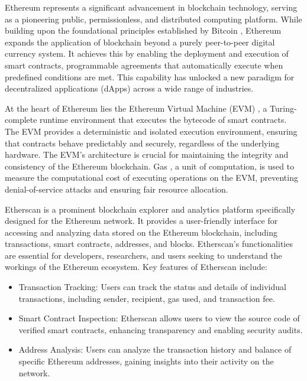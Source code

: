 \documentclass[acmsmall,screen]{acmart}
\begin{document}
	Ethereum \cite{ethereum} represents a significant advancement in blockchain technology, serving as a pioneering public, permissionless, and distributed computing platform. While building upon the foundational principles established by Bitcoin \cite{Bitcoin}, Ethereum expands the application of blockchain beyond a purely peer-to-peer digital currency system. It achieves this by enabling the deployment and execution of smart contracts, programmable agreements that automatically execute when predefined conditions are met. This capability has unlocked a new paradigm for decentralized applications (dApps) across a wide range of industries.

	At the heart of Ethereum lies the Ethereum Virtual Machine (EVM) \cite{EVM}, a Turing-complete runtime environment that executes the bytecode of smart contracts. The EVM provides a deterministic and isolated execution environment, ensuring that contracts behave predictably and securely, regardless of the underlying hardware. The EVM's architecture is crucial for maintaining the integrity and consistency of the Ethereum blockchain. Gas \cite{Gas}, a unit of computation, is used to measure the computational cost of executing operations on the EVM, preventing denial-of-service attacks and ensuring fair resource allocation.

	Etherscan \cite{etherscan} is a prominent blockchain explorer and analytics platform specifically designed for the Ethereum network. It provides a user-friendly interface for accessing and analyzing data stored on the Ethereum blockchain, including transactions, smart contracts, addresses, and blocks. Etherscan's functionalities are essential for developers, researchers, and users seeking to understand the workings of the Ethereum ecosystem. Key features of Etherscan include:
	\begin{itemize}
		\item Transaction Tracking: Users can track the status and details of individual transactions, including sender, recipient, gas used, and transaction fee.
		\item Smart Contract Inspection: Etherscan allows users to view the source code of verified smart contracts, enhancing transparency and enabling security audits.
		\item Address Analysis: Users can analyze the transaction history and balance of specific Ethereum addresses, gaining insights into their activity on the network.
	\end{itemize}
\end{document}
